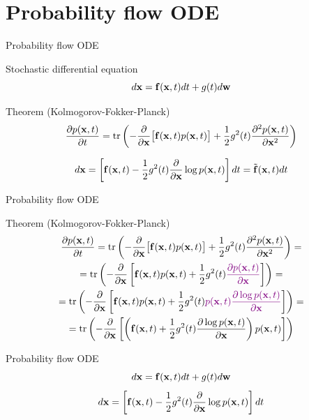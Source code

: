 \section{Probability flow ODE}
\begin{frame}{Probability flow ODE}
	\begin{block}{Stochastic differential equation}
		\[
			d\mathbf{x} = \mathbf{f}(\mathbf{x}, t) dt + g(t) d \mathbf{w}
		\] 	
	\end{block}
	\begin{block}{Theorem (Kolmogorov-Fokker-Planck)}
 		\vspace{-0.2cm}
 		\[
 			\frac{\partial p(\mathbf{x}, t)}{\partial t} = \text{tr}\left(- \frac{\partial}{\partial \mathbf{x}} \bigl[ \mathbf{f}(\mathbf{x}, t) p(\mathbf{x}, t)\bigr] + \frac{1}{2} g^2(t) \frac{\partial^2 p(\mathbf{x}, t)}{\partial \mathbf{x}^2} \right)
 		\]
 	\end{block}
		\[
			d\mathbf{x} = \left[\mathbf{f}(\mathbf{x}, t) -\frac{1}{2} g^2(t) \frac{\partial}{\partial \mathbf{x}} \log p(\mathbf{x}, t) \right] dt = \tilde{\mathbf{f}}(\mathbf{x}, t) dt
		\] 	
\end{frame}
\begin{frame}{Probability flow ODE}
	\begin{block}{Theorem (Kolmogorov-Fokker-Planck)}
 		\vspace{-0.2cm}
 		\begin{multline*}
 			\frac{\partial p(\mathbf{x}, t)}{\partial t} = \text{tr}\left(- \frac{\partial}{\partial \mathbf{x}} \bigl[ \mathbf{f}(\mathbf{x}, t) p(\mathbf{x}, t)\bigr] + \frac{1}{2} g^2(t) \frac{\partial^2 p(\mathbf{x}, t)}{\partial \mathbf{x}^2} \right) = \\
 			=  \text{tr}\left(- \frac{\partial}{\partial \mathbf{x}} \left[ \mathbf{f}(\mathbf{x}, t) p(\mathbf{x}, t) + \frac{1}{2} g^2(t) {\color{violet}\frac{\partial p(\mathbf{x}, t)}{\partial \mathbf{x}}} \right]  \right) = \\
 			 =  \text{tr}\left(- \frac{\partial}{\partial \mathbf{x}} \left[ \mathbf{f}(\mathbf{x}, t) p(\mathbf{x}, t) + \frac{1}{2} g^2(t) {\color{violet}p(\mathbf{x}, t) \frac{\partial \log p(\mathbf{x}, t)}{\partial \mathbf{x}}} \right]  \right)= \\
 			  =  \text{tr}\left(- \frac{\partial}{\partial \mathbf{x}} \left[ \left( \mathbf{f}(\mathbf{x}, t) + \frac{1}{2} g^2(t) \frac{\partial \log p(\mathbf{x}, t)}{\partial \mathbf{x}}\right) p(\mathbf{x}, t) \right]  \right)
 		\end{multline*}
 	\end{block}
\end{frame}
\begin{frame}{Probability flow ODE}
	\[
		d\mathbf{x} = \mathbf{f}(\mathbf{x}, t) dt + g(t) d \mathbf{w}
	\] 	
	\[
		d\mathbf{x} = \left[\mathbf{f}(\mathbf{x}, t) -\frac{1}{2} g^2(t) \frac{\partial}{\partial \mathbf{x}} \log p(\mathbf{x}, t) \right] dt
	\]
\end{frame}
